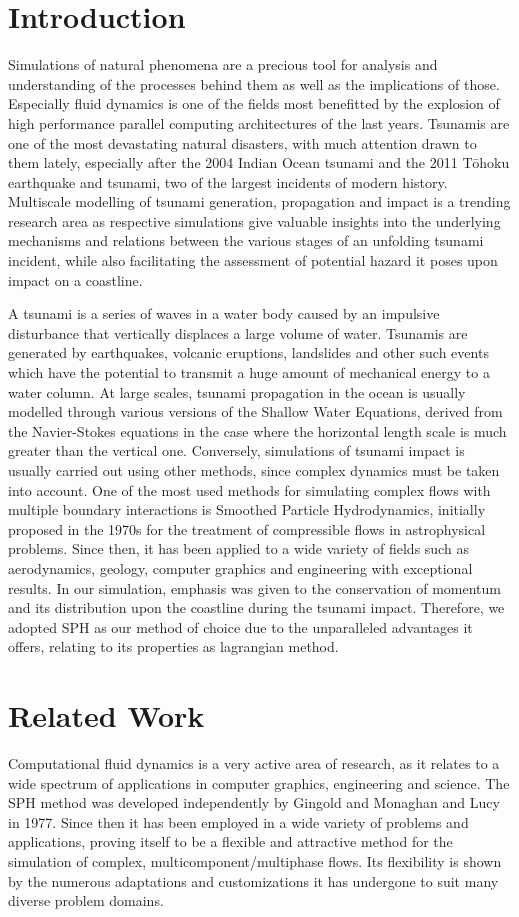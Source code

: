 \documentclass{llncs}
\begin{document}
\section{Introduction}
Simulations of natural phenomena are a precious tool for analysis and understanding of the
processes behind them as well as the implications of those. Especially fluid dynamics is
one of the fields most benefitted by the explosion of high performance parallel computing
architectures of the last years. Tsunamis are one of the most devastating natural
disasters, with much attention drawn to them lately, especially after the 2004 Indian
Ocean tsunami and the 2011 T\={o}hoku earthquake and tsunami, two of the largest incidents
of modern history. Multiscale modelling of tsunami generation, propagation and impact is a
trending research area as respective simulations give valuable insights into the
underlying mechanisms and relations between the various stages of an unfolding tsunami
incident, while also facilitating the assessment of potential hazard it poses upon impact
on a coastline.

A tsunami is a series of waves in a water body caused by an impulsive disturbance that
vertically displaces a large volume of water. Tsunamis are generated by earthquakes,
volcanic eruptions, landslides and other such events which have the potential to transmit
a huge amount of mechanical energy to a water column. At large scales, tsunami propagation
in the ocean is usually modelled through various versions of the Shallow Water Equations,
derived from the Navier-Stokes equations in the case where the horizontal length scale is
much greater than the vertical one. Conversely, simulations of tsunami impact is usually
carried out using other methods, since complex dynamics must be taken into account. One of
the most used methods for simulating complex flows with multiple boundary interactions is
Smoothed Particle Hydrodynamics, initially proposed in the 1970s for the treatment of
compressible flows in astrophysical problems. Since then, it has been applied to a wide
variety of fields such as aerodynamics, geology, computer graphics and engineering with
exceptional results. In our simulation, emphasis was given to the conservation of momentum
and its distribution upon the coastline during the tsunami impact. Therefore, we adopted
SPH as our method of choice due to the unparalleled advantages it offers, relating to its
properties as lagrangian method.

\section{Related Work}
Computational fluid dynamics is a very active area of research, as it relates to a wide
spectrum of applications in computer graphics, engineering and science. The SPH method was
developed independently by Gingold and Monaghan \cite{gingold1977375} and Lucy
\cite{lucy19771013} in 1977. Since then it has been employed in a wide variety of problems
and applications, proving itself to be a flexible and attractive method for the simulation
of complex, multicomponent/multiphase flows. Its flexibility is shown by the numerous
adaptations and customizations it has undergone to suit many diverse problem domains.
\end{document}
